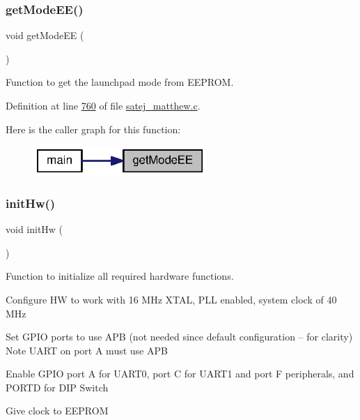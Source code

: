 \subsubsection{\texorpdfstring{getModeEE()}{getModeEE()}}
{\footnotesize\ttfamily void get\+Mode\+EE (\begin{DoxyParamCaption}{ }\end{DoxyParamCaption})}



Function to get the launchpad mode from E\+E\+P\+R\+OM. 



Definition at line \mbox{\hyperlink{satej__matthew_8c_source_l00760}{760}} of file \mbox{\hyperlink{satej__matthew_8c_source}{satej\+\_\+matthew.\+c}}.

Here is the caller graph for this function\+:
\nopagebreak
\begin{figure}[H]
\begin{center}
\leavevmode
\includegraphics[width=186pt]{satej__matthew_8c_a19138fc0f5846980204bb7be7e119d56_icgraph}
\end{center}
\end{figure}
\mbox{\label{satej__matthew_8c_ae5e20c90f0611c1fd09fad99cc3a30a6}} 
\subsubsection{\texorpdfstring{initHw()}{initHw()}}
{\footnotesize\ttfamily void init\+Hw (\begin{DoxyParamCaption}{ }\end{DoxyParamCaption})}



Function to initialize all required hardware functions. 

Configure HW to work with 16 M\+Hz X\+T\+AL, P\+LL enabled, system clock of 40 M\+Hz

Set G\+P\+IO ports to use A\+PB (not needed since default configuration -- for clarity) Note U\+A\+RT on port A must use A\+PB

Enable G\+P\+IO port A for U\+A\+R\+T0, port C for U\+A\+R\+T1 and port F peripherals, and P\+O\+R\+TD for D\+IP Switch

Give clock to E\+E\+P\+R\+OM

